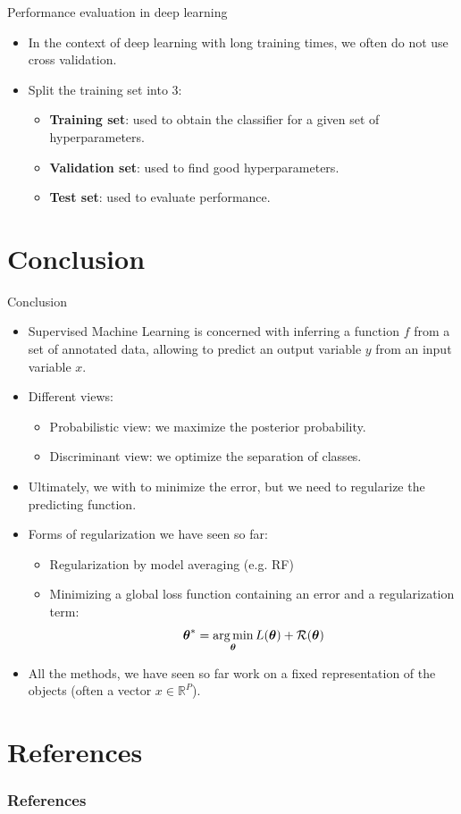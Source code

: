\documentclass[xcolor=pdftex,dvipsnames,table]{beamer}
\begin{document}
\begin{frame}{Performance evaluation in deep learning}
	\begin{itemize}
		\item In the context of deep learning with long training times, we often do not use cross validation.
		\item Split the training set into 3:
		\begin{itemize}
			\item {\bf Training set}: used to obtain the classifier for a given set of hyperparameters.
			\item {\bf Validation set}: used to find good hyperparameters.
			\item {\bf Test set}: used to evaluate performance.
		\end{itemize}
	\end{itemize}
\end{frame}


\section{Conclusion}
\begin{frame}{Conclusion}
	\begin{itemize}
		\item Supervised Machine Learning is concerned with inferring a function $f$ from a set of annotated data, allowing to predict an output variable $y$ from an input variable $x$.
		\item Different views:
			\begin{itemize}
				\item Probabilistic view: we maximize the posterior probability.
				\item Discriminant view: we optimize the separation of classes.
			\end{itemize}
		\item Ultimately, we with to minimize the error, but we need to regularize the predicting function.
		\item Forms of regularization we have seen so far:
			\begin{itemize}
				\item Regularization by model averaging (e.g. RF)
				\item Minimizing a global loss function containing an error and a regularization term:
				\begin{equation*}
					\boldsymbol{\theta} ^{\ast} = \operatorname*{arg\,min}_{\boldsymbol{\theta}} L (\boldsymbol{\theta}) + \mathcal{R}(\boldsymbol{\theta})
				\end{equation*}
			\end{itemize}
		\item All the methods, we have seen so far work on a fixed representation of the objects (often a vector $x \in\mathbb{R}^P$).
	\end{itemize}
\end{frame}


\section{References}
\begin{frame}[allowframebreaks]
	\frametitle{References}
	
\end{frame}
\end{document}

